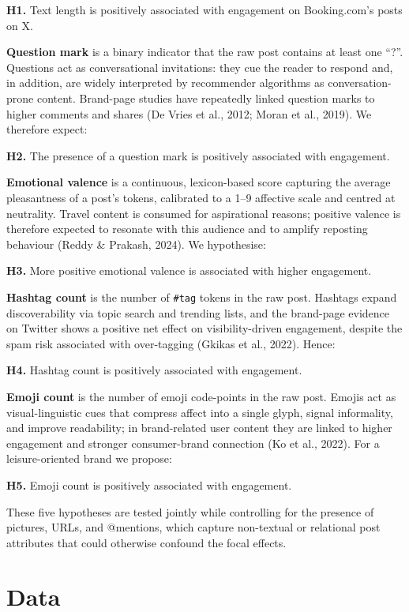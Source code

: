 \documentclass[12pt,a4paper]{article}
\begin{document}
\textbf{H1.} Text length is positively associated with engagement on Booking.com's posts on X.

\textbf{Question mark} is a binary indicator that the raw post contains at least one ``?''. Questions act as conversational invitations: they cue the reader to respond and, in addition, are widely interpreted by recommender algorithms as conversation-prone content. Brand-page studies have repeatedly linked question marks to higher comments and shares (De Vries et al., 2012; Moran et al., 2019). We therefore expect:

\textbf{H2.} The presence of a question mark is positively associated with engagement.

\textbf{Emotional valence} is a continuous, lexicon-based score capturing the average pleasantness of a post's tokens, calibrated to a 1--9 affective scale and centred at neutrality. Travel content is consumed for aspirational reasons; positive valence is therefore expected to resonate with this audience and to amplify reposting behaviour (Reddy \& Prakash, 2024). We hypothesise:

\textbf{H3.} More positive emotional valence is associated with higher engagement.

\textbf{Hashtag count} is the number of \texttt{\#tag} tokens in the raw post. Hashtags expand discoverability via topic search and trending lists, and the brand-page evidence on Twitter shows a positive net effect on visibility-driven engagement, despite the spam risk associated with over-tagging (Gkikas et al., 2022). Hence:

\textbf{H4.} Hashtag count is positively associated with engagement.

\textbf{Emoji count} is the number of emoji code-points in the raw post. Emojis act as visual-linguistic cues that compress affect into a single glyph, signal informality, and improve readability; in brand-related user content they are linked to higher engagement and stronger consumer-brand connection (Ko et al., 2022). For a leisure-oriented brand we propose:

\textbf{H5.} Emoji count is positively associated with engagement.

These five hypotheses are tested jointly while controlling for the presence of pictures, URLs, and @mentions, which capture non-textual or relational post attributes that could otherwise confound the focal effects.

\section{Data}
\end{document}
